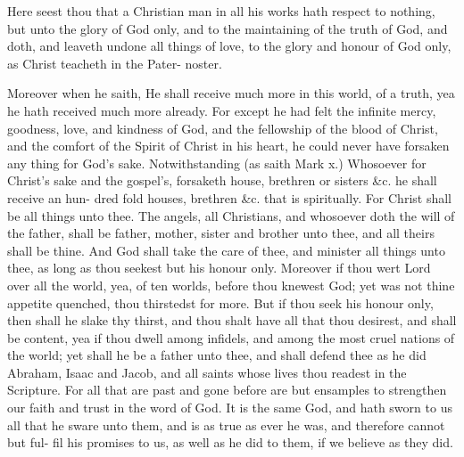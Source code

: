 Here seest thou that a Christian man in all his works 
hath respect to nothing, but unto the glory of God only, 
and to the maintaining of the truth of God, and doth, 
and leaveth undone all things of love, to the glory and 
honour of God only, as Christ teacheth in the Pater- 
noster. 

Moreover when he saith, He shall receive much more 
in this world, of a truth, yea he hath received much more 
already. For except he had felt the infinite mercy, 
goodness, love, and kindness of God, and the fellowship 
of the blood of Christ, and the comfort of the Spirit of 
Christ in his heart, he could never have forsaken any thing 
for God's sake. Notwithstanding (as saith Mark x.) 
Whosoever for Christ's sake and the gospel's, forsaketh 
house, brethren or sisters \&c. he shall receive an hun- 
dred fold houses, brethren \&c. that is spiritually. For 
Christ shall be all things unto thee. The angels, all 
Christians, and whosoever doth the will of the father, 
shall be father, mother, sister and brother unto thee, and 
all theirs shall be thine. And God shall take the care of 
thee, and minister all things unto thee, as long as thou 
seekest but his honour only. Moreover if thou wert 
Lord over all the world, yea, of ten worlds, before thou 
knewest God; yet was not thine appetite quenched, thou 
thirstedst for more. But if thou seek his honour only, 
then shall he slake thy thirst, and thou shalt have all that 
thou desirest, and shall be content, yea if thou dwell 
among infidels, and among the most cruel nations of 
the world; yet shall he be a father unto thee, and shall 
defend thee as he did Abraham, Isaac and Jacob, and all 
saints whose lives thou readest in the Scripture. For all 
that are past and gone before are but ensamples to strengthen 
our faith and trust in the word of God. It is the same 
God, and hath sworn to us all that he sware unto them, 
and is as true as ever he was, and therefore cannot but ful- 
fil his promises to us, as well as he did to them, if we 
believe as they did. 

